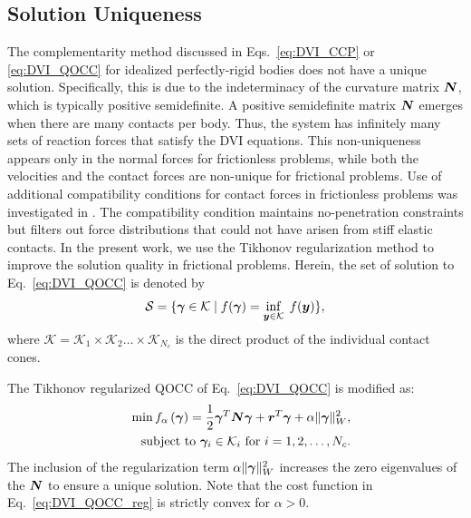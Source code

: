 \subsection{Solution Uniqueness}\label{sec:Uniqueness}
The complementarity method discussed in Eqs.~\ref{eq:DVI_CCP} or \ref{eq:DVI_QOCC} for idealized perfectly-rigid bodies does not have a unique solution. Specifically, this is due to the indeterminacy of the curvature matrix $\boldsymbol{N}$, which is typically positive semidefinite. A positive semidefinite matrix $\boldsymbol{N}$ emerges when there are many contacts per body. Thus, the system has infinitely many sets of reaction forces that satisfy the DVI equations. This non-uniqueness appears only in the normal forces for frictionless problems, while both the velocities and the contact forces are non-unique for frictional problems. Use of additional compatibility conditions for contact forces in frictionless problems was investigated in \cite{olsen2018resolving}. The compatibility condition maintains no-penetration constraints but filters out force distributions that could not have arisen from stiff elastic contacts. In the present work, we use the Tikhonov regularization method to improve the solution quality in frictional problems. 
Herein, the set of solution to Eq.~\ref{eq:DVI_QOCC} is denoted by 
\begin{equation}
\mathcal{S} = \{ \boldsymbol{\gamma} \in {\mathcal{K}}  \;| \; f(\boldsymbol{\gamma}) = \inf_{\boldsymbol{y} \in \mathcal{K}} \; f(\boldsymbol{y}) \}, 
\end{equation}
where $\mathcal{K}=\mathcal{K}_1\times\mathcal{K}_2 \hdots \times \mathcal{K}_{N_c}$  is the direct product of the individual contact cones.

The Tikhonov regularized QOCC of Eq.~\ref{eq:DVI_QOCC}  is modified as:
\begin{eqnarray}\label{eq:DVI_QOCC_reg}
&&\min f_\alpha \left(\boldsymbol{\gamma}\right) = \frac{1}{2}\boldsymbol{\gamma}^T \boldsymbol{N} \boldsymbol{\gamma}+\boldsymbol{r}^T \boldsymbol{\gamma} + \alpha \|\boldsymbol{\gamma}\|^2_W  \label{eq:OPT_friction_ref},\\
&&\text{subject to } \boldsymbol{\gamma}_i \in {\mathcal{K}}_i \text{ for } i=1,2,\ldots,N_c. \nonumber
\end{eqnarray}
The inclusion of the regularization term $\alpha \|\boldsymbol{\gamma}\|^2_W$ increases the zero eigenvalues of the $\boldsymbol{N}$ to ensure a unique solution. Note that the cost function in Eq.~\ref{eq:DVI_QOCC_reg} is strictly convex for ${\alpha}>0$. 

